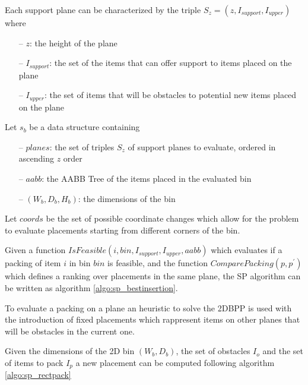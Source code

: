 Each support plane can be characterized by the triple $S_z = (z, I_{support}, I_{upper})$ where
\begin{itemize}
    \item[--] $z$: the height of the plane 
    \item[--] $I_{support}$: the set of the items that can offer support to items placed on the plane
    \item[--] $I_{upper}$: the set of items that will be obstacles to potential new items placed on the plane %
\end{itemize}%

Let $s_b$ be a data structure containing
\begin{itemize}
    \item[--] $planes$: the set of triples $S_z$ of support planes to evaluate, ordered in ascending $z$ order
    \item[--] $aabb$: the AABB Tree of the items placed in the evaluated bin
    \item[--] $(W_{b}, D_{b}, H_{b})$: the dimensions of the bin
\end{itemize}

Let $coords$ be the set of possible coordinate changes which allow for the problem to evaluate placements starting from different corners of the bin. %

Given a function $IsFeasible(i, bin, I_{support}, I_{upper}, aabb)$ which evaluates if a packing of item $i$ in bin $bin$ is feasible,
and the function $ComparePacking(p, p^\prime)$ which defines a ranking over placements in the same plane,
the SP algorithm can be written as algorithm \ref{algo:sp_bestinsertion}.



To evaluate a packing on a plane an heuristic to solve the 2DBPP is used with the introduction of fixed placements which rappresent items on other planes that will be obstacles in the current one.


Given the dimensions of the 2D bin $(W_b, D_b)$, the set of obstacles $I_{o}$ and the set of items to pack $I_{p}$ a new placement can be computed following algorithm \ref{algo:sp_rectpack}

